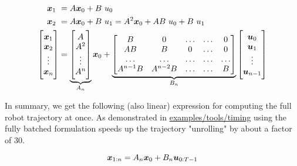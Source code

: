 \begin{align}
\x_1 &= A \x_0 + B \ u_0 \\
\x_2 &= A \x_0 + B \ u_1 = A^2 \x_0 + A B \ u_0 + B \ u_1\\
\begin{bmatrix} \x_1 \\ \x_2 \\ \vdots \\ \x_n \end{bmatrix} &= \underbrace{\begin{bmatrix} A \\ A^2 \\ \vdots \\ A^n \end{bmatrix}}_{\substack{A_n}} \x_0 + \underbrace{\begin{bmatrix} B & 0 & \hdots & \hdots & 0 \\ AB & B & 0 & \hdots & 0 \\ \hdots & \hdots & \hdots & \hdots & \hdots \\ A^{n-1} B & A^{n-2} B & \hdots & \hdots & B \end{bmatrix}}_{\substack{B_n}} \begin{bmatrix} \u_0 \\ \u_1 \\ \vdots \\ \u_{n-1} \end{bmatrix}
\end{align}

In summary, we get the following (also linear) expression for computing the full robot trajectory at once. As demonstrated in \href{https://github.com/simon-schaefer/mantrap/blob/master/examples/timing.ipynb}{examples/tools/timing} using the fully batched formulation speeds up the trajectory "unrolling" by about a factor of 30.

\begin{equation}
\boldsymbol{x}_{1:n} = A_n \boldsymbol{x}_0 + B_n \boldsymbol{u}_{0:T-1}
\label{eq:dynamics_stacked}
\end{equation}
